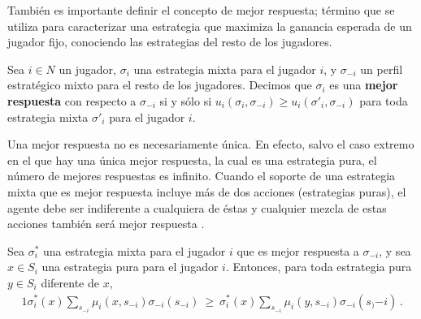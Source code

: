 También es importante definir el concepto de mejor respuesta; término que se utiliza para caracterizar una estrategia que maximiza la ganancia esperada de un jugador fijo, conociendo las estrategias del resto de los jugadores.

\begin{definition}
\label{def:mejor-respuesta}
Sea $i\in N$ un jugador, $\sigma_i$ una estrategia mixta para el jugador $i$, y $\sigma_{-i}$ un perfil estrat\'egico mixto para el resto de los jugadores. Decimos que $\sigma_i$ es una \textbf{mejor respuesta} con respecto a $\sigma_{-i}$ si y s\'olo si
$u_i(\sigma_i,\sigma_{-i}) \geq u_i(\sigma'_i,\sigma_{-i})$ para toda estrategia mixta $\sigma'_i$ para el jugador $i$.
\end{definition}

Una mejor respuesta no es necesariamente única. En efecto, salvo el caso extremo en el que hay una única mejor respuesta, la cual es una estrategia pura, el número de mejores respuestas es infinito. Cuando el soporte de una estrategia mixta que es mejor respuesta incluye más de dos acciones (estrategias puras), el agente debe ser indiferente a cualquiera de éstas y cualquier mezcla de estas acciones también será mejor respuesta \cite{bib:tutorial-existence-nash}. %

\begin{lemma}
\label{lemma:2}
Sea $\sigma^*_i$ una estrategia mixta para el jugador $i$ que es mejor respuesta a $\sigma_{-i}$, y sea $x\in S_i$ una estrategia pura para el jugador $i$. Entonces, para toda estrategia pura $y\in S_i$ diferente de $x$,
\begin{alignat}{1}
  \sigma^*_i(x) \sum_{s_{-i}} \mu_i(x,s_{-i}) \sigma_{-i}(s_{-i})\ \geq\ \sigma^*_i(x) \sum_{s_{-i}} \mu_i(y,s_{-i}) \sigma_{-i}(s_){-i}) \,.
\end{alignat}
\end{lemma}

